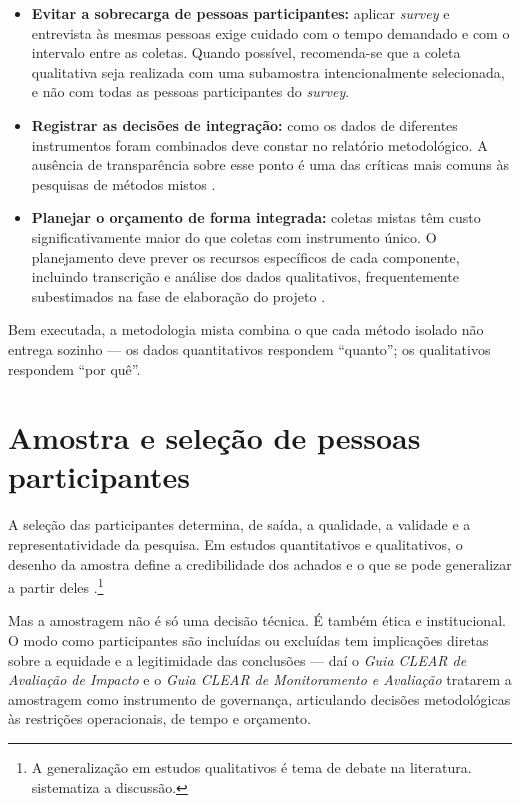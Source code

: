 \documentclass[12pt, a4paper, openany]{book}
\begin{document}
\begin{itemize}
\item \textbf{Evitar a sobrecarga de pessoas participantes:} aplicar \textit{survey} e entrevista \`as mesmas pessoas exige cuidado com o tempo demandado e com o intervalo entre as coletas. Quando poss\'ivel, recomenda-se que a coleta qualitativa seja realizada com uma subamostra intencionalmente selecionada, e n\~ao com todas as pessoas participantes do \textit{survey}.
\item \textbf{Registrar as decis\~oes de integra\c{c}\~ao:} como os dados de diferentes instrumentos foram combinados deve constar no relat\'orio metodol\'ogico. A aus\^encia de transpar\^encia sobre esse ponto \'e uma das cr\'iticas mais comuns \`as pesquisas de m\'etodos mistos \citep{bryman2012social}.
\item \textbf{Planejar o or\c{c}amento de forma integrada:} coletas mistas t\^em custo significativamente maior do que coletas com instrumento \'unico. O planejamento deve prever os recursos espec\'ificos de cada componente, incluindo transcri\c{c}\~ao e an\'alise dos dados qualitativos, frequentemente subestimados na fase de elabora\c{c}\~ao do projeto \citep{duru2021grant}.
\end{itemize}

Bem executada, a metodologia mista combina o que cada m\'etodo isolado n\~ao entrega sozinho --- os dados quantitativos respondem ``quanto''; os qualitativos respondem ``por qu\^e''.

\chapter{Amostra e sele\c{c}\~ao de pessoas participantes}

A sele\c{c}\~ao das participantes determina, de sa\'ida, a qualidade, a validade e a representatividade da pesquisa. Em estudos quantitativos e qualitativos, o desenho da amostra define a credibilidade dos achados e o que se pode generalizar a partir deles \citep{neuman2014social,gertler2018impact}.\footnote{A generaliza\c{c}\~ao em estudos qualitativos \'e tema de debate na literatura. \citet{mattos2011resultados} sistematiza a discuss\~ao.}

Mas a amostragem n\~ao \'e s\'o uma decis\~ao t\'ecnica. \'E tamb\'em \'etica e institucional. O modo como participantes s\~ao inclu\'idas ou exclu\'idas tem implica\c{c}\~oes diretas sobre a equidade e a legitimidade das conclus\~oes --- da\'i o \textit{Guia CLEAR de Avalia\c{c}\~ao de Impacto} \citep{fgvclear2025ai} e o \textit{Guia CLEAR de Monitoramento e Avalia\c{c}\~ao} \citep{fgvclear2025mea} tratarem a amostragem como instrumento de governan\c{c}a, articulando decis\~oes metodol\'ogicas \`as restri\c{c}\~oes operacionais, de tempo e or\c{c}amento.
\end{document}
